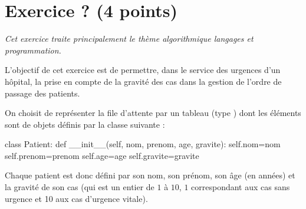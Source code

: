 \documentclass[11pt,a4paper,french,twoside]{VcCours}
\begin{document}
\section*{Exercice ? (4 points)}
\emph{Cet exercice traite principalement le thème \og{} algorithmique
langages et programmation\fg{}.}

L'objectif de cet exercice est de permettre, dans le service des urgences
d'un hôpital, la prise en compte de la gravité des cas dans la gestion
de l'ordre de passage des patients.

\medskip
On choisit de représenter la file d'attente par un tableau (type )
dont les éléments sont de objets définis par la classe suivante :
\begin{Python}
class Patient:
    def __init__(self, nom, prenom, age, gravite):
        self.nom=nom
        self.prenom=prenom
        self.age=age
        self.gravite=gravite
\end{Python}
Chaque patient est donc défini par son nom, son prénom, son âge (en années)
et la gravité de son cas (qui est un entier de $1$ à $10$, $1$ correspondant
aux cas sans urgence et 10 aux cas d'urgence vitale).
\end{document}
